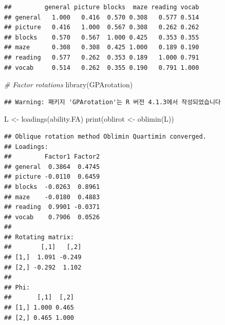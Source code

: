 \documentclass[
]{article}
\newenvironment{Shaded}{\begin{snugshade}}{\end{snugshade}}
\newcommand{\CommentTok}[1]{\textcolor[rgb]{0.56,0.35,0.01}{\textit{#1}}}
\newcommand{\DecValTok}[1]{\textcolor[rgb]{0.00,0.00,0.81}{#1}}
\newcommand{\FunctionTok}[1]{\textcolor[rgb]{0.00,0.00,0.00}{#1}}
\newcommand{\NormalTok}[1]{#1}
\newcommand{\OtherTok}[1]{\textcolor[rgb]{0.56,0.35,0.01}{#1}}
\newcommand{\SpecialCharTok}[1]{\textcolor[rgb]{0.00,0.00,0.00}{#1}}
\begin{document}
\begin{Shaded}
\end{Shaded}

\begin{verbatim}
##         general picture blocks  maze reading vocab
## general   1.000   0.416  0.570 0.308   0.577 0.514
## picture   0.416   1.000  0.567 0.308   0.262 0.262
## blocks    0.570   0.567  1.000 0.425   0.353 0.355
## maze      0.308   0.308  0.425 1.000   0.189 0.190
## reading   0.577   0.262  0.353 0.189   1.000 0.791
## vocab     0.514   0.262  0.355 0.190   0.791 1.000
\end{verbatim}

\begin{Shaded}
\begin{Highlighting}[]
\CommentTok{\# Factor rotations}
\FunctionTok{library}\NormalTok{(GPArotation)}
\end{Highlighting}
\end{Shaded}

\begin{verbatim}
## Warning: 패키지 'GPArotation'는 R 버전 4.1.3에서 작성되었습니다
\end{verbatim}

\begin{Shaded}
\begin{Highlighting}[]
\NormalTok{L }\OtherTok{\textless{}{-}} \FunctionTok{loadings}\NormalTok{(ability.FA)}
\FunctionTok{print}\NormalTok{(oblirot }\OtherTok{\textless{}{-}} \FunctionTok{oblimin}\NormalTok{(L))}
\end{Highlighting}
\end{Shaded}

\begin{verbatim}
## Oblique rotation method Oblimin Quartimin converged.
## Loadings:
##         Factor1 Factor2
## general  0.3864  0.4745
## picture -0.0110  0.6459
## blocks  -0.0263  0.8961
## maze    -0.0180  0.4883
## reading  0.9901 -0.0371
## vocab    0.7906  0.0526
## 
## Rotating matrix:
##        [,1]   [,2]
## [1,]  1.091 -0.249
## [2,] -0.292  1.102
## 
## Phi:
##       [,1]  [,2]
## [1,] 1.000 0.465
## [2,] 0.465 1.000
\end{verbatim}
\end{document}
